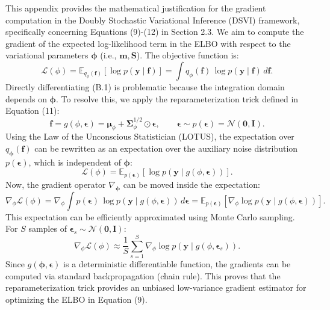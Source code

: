 \documentclass[11pt]{article}
\begin{document}
	This appendix provides the mathematical justification for the gradient computation in the Doubly Stochastic Variational Inference (DSVI) framework, specifically concerning Equations (9)-(12) in Section 2.3.
	We aim to compute the gradient of the expected log-likelihood term in the ELBO with respect to the variational parameters $\boldsymbol{\phi}$ (i.e., $\mathbf{m}, \mathbf{S}$). The objective function is:
	\begin{equation}
		\mathcal{L}(\phi)
		= \mathbb{E}_{q_{\phi}(\mathbf{f})}\!\left[\log p(\mathbf{y}\mid \mathbf{f})\right]
		= \int q_{\phi}(\mathbf{f})\,\log p(\mathbf{y}\mid \mathbf{f})\,d\mathbf{f}.
	\end{equation}
	Directly differentiating (B.1) is problematic because the integration domain depends on $\boldsymbol{\phi}$. To resolve this, we apply the reparameterization trick defined in Equation (11):
	\begin{equation}
		\mathbf{f}
		= g(\phi,\boldsymbol{\epsilon})
		= \boldsymbol{\mu}_{\phi} + \boldsymbol{\Sigma}_{\phi}^{1/2}\odot \boldsymbol{\epsilon},
		\qquad
		\boldsymbol{\epsilon}\sim p(\boldsymbol{\epsilon})=\mathcal{N}(\mathbf{0},\mathbf{I}).
	\end{equation}
	Using the Law of the Unconscious Statistician (LOTUS), the expectation over $q_{\boldsymbol{\phi}}(\mathbf{f})$ can be rewritten as an expectation over the auxiliary noise distribution $p(\boldsymbol{\epsilon})$, which is independent of $\boldsymbol{\phi}$:
	\begin{equation}
		\mathcal{L}(\phi)
		= \mathbb{E}_{p(\boldsymbol{\epsilon})}\!\left[\log p\!\left(\mathbf{y}\mid g(\phi,\boldsymbol{\epsilon})\right)\right].
	\end{equation}
	Now, the gradient operator $\nabla_{\boldsymbol{\phi}}$ can be moved inside the expectation:
	\begin{equation}
		\nabla_{\phi}\mathcal{L}(\phi)
		= \nabla_{\phi}\int p(\boldsymbol{\epsilon})\,\log p\!\left(\mathbf{y}\mid g(\phi,\boldsymbol{\epsilon})\right)\,d\boldsymbol{\epsilon}
		= \mathbb{E}_{p(\boldsymbol{\epsilon})}\!\left[\nabla_{\phi}\log p\!\left(\mathbf{y}\mid g(\phi,\boldsymbol{\epsilon})\right)\right].
	\end{equation}
	This expectation can be efficiently approximated using Monte Carlo sampling. For $S$ samples of $\boldsymbol{\epsilon}_s \sim \mathcal{N}(\mathbf{0}, \mathbf{I})$:
	\begin{equation}
		\nabla_{\phi}\mathcal{L}(\phi)
		\approx \frac{1}{S}\sum_{s=1}^{S}\nabla_{\phi}\log p\!\left(\mathbf{y}\mid g(\phi,\boldsymbol{\epsilon}_s)\right).
	\end{equation}
	Since $g(\boldsymbol{\phi}, \boldsymbol{\epsilon})$ is a deterministic differentiable function, the gradients can be computed via standard backpropagation (chain rule). This proves that the reparameterization trick provides an unbiased low-variance gradient estimator for optimizing the ELBO in Equation (9).
\end{document}
